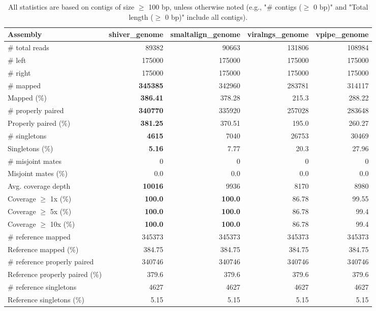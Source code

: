 \documentclass[12pt,a4paper]{article}
\begin{document}
\begin{table}[ht]
\begin{center}
\caption{All statistics are based on contigs of size $\geq$ 100 bp, unless otherwise noted (e.g., "\# contigs ($\geq$ 0 bp)" and "Total length ($\geq$ 0 bp)" include all contigs).}
\begin{tabular}{|l*{4}{|r}|}
\hline
Assembly & shiver\_genome & smaltalign\_genome & viralngs\_genome & vpipe\_genome \\ \hline
\# total reads & 89382 & 90663 & 131806 & 108984 \\ \hline
\# left & 175000 & 175000 & 175000 & 175000 \\ \hline
\# right & 175000 & 175000 & 175000 & 175000 \\ \hline
\# mapped & {\bf 345385} & 342960 & 283781 & 314117 \\ \hline
Mapped (\%) & {\bf 386.41} & 378.28 & 215.3 & 288.22 \\ \hline
\# properly paired & {\bf 340770} & 335920 & 257028 & 283648 \\ \hline
Properly paired (\%) & {\bf 381.25} & 370.51 & 195.0 & 260.27 \\ \hline
\# singletons & {\bf 4615} & 7040 & 26753 & 30469 \\ \hline
Singletons (\%) & {\bf 5.16} & 7.77 & 20.3 & 27.96 \\ \hline
\# misjoint mates & 0 & 0 & 0 & 0 \\ \hline
Misjoint mates (\%) & 0.0 & 0.0 & 0.0 & 0.0 \\ \hline
Avg. coverage depth & {\bf 10016} & 9936 & 8170 & 8980 \\ \hline
Coverage $\geq$ 1x (\%) & {\bf 100.0} & {\bf 100.0} & 86.78 & 99.55 \\ \hline
Coverage $\geq$ 5x (\%) & {\bf 100.0} & {\bf 100.0} & 86.78 & 99.4 \\ \hline
Coverage $\geq$ 10x (\%) & {\bf 100.0} & {\bf 100.0} & 86.78 & 99.4 \\ \hline
\# reference mapped & 345373 & 345373 & 345373 & 345373 \\ \hline
Reference mapped (\%) & 384.75 & 384.75 & 384.75 & 384.75 \\ \hline
\# reference properly paired & 340746 & 340746 & 340746 & 340746 \\ \hline
Reference properly paired (\%) & 379.6 & 379.6 & 379.6 & 379.6 \\ \hline
\# reference singletons & 4627 & 4627 & 4627 & 4627 \\ \hline
Reference singletons (\%) & 5.15 & 5.15 & 5.15 & 5.15 \\ \hline

\end{tabular}
\end{center}
\end{table}
\end{document}
